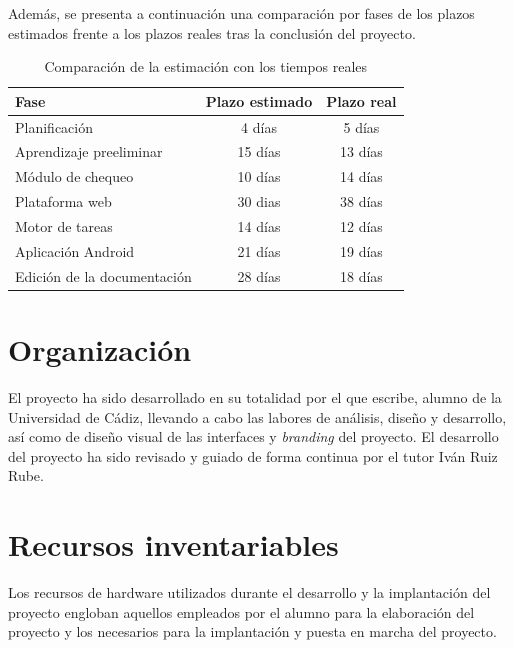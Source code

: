 Además, se presenta a continuación una comparación por fases de los plazos
estimados frente a los plazos reales tras la conclusión del proyecto.

\begin{table}[hbtp]
  \centering
  \begin{tabular}{|l|c|c|}
    \hline
    \textbf{Fase} & \textbf{Plazo estimado} & \textbf{Plazo real} \\
    \hline
    Planificación & 4 días & 5 días \\
    \hline
    Aprendizaje preeliminar & 15 días & 13 días \\
    \hline
    Módulo de chequeo & 10 días & 14 días \\
    \hline
    Plataforma web & 30 dias & 38 días \\
    \hline
    Motor de tareas & 14 días & 12 días \\
    \hline 
    Aplicación Android & 21 días & 19 días \\
    \hline
    Edición de la documentación & 28 días & 18 días \\
    \hline
  \end{tabular}
  \caption{Comparación de la estimación con los tiempos reales}
  \label{tab:estimacion_tiempo}
\end{table}

\section{Organización}

El proyecto ha sido desarrollado en su totalidad por el que escribe, alumno de
la Universidad de Cádiz, llevando a cabo las labores de análisis, diseño y
desarrollo, así como de diseño visual de las interfaces y \textit{branding} del
proyecto. El desarrollo del proyecto ha sido revisado y guiado de forma continua por el
tutor Iván Ruiz Rube.

\section{Recursos inventariables}

Los recursos de hardware utilizados durante el desarrollo y la implantación del
proyecto engloban aquellos empleados por el alumno para la elaboración del
proyecto y los necesarios para la implantación y puesta en marcha del proyecto.

